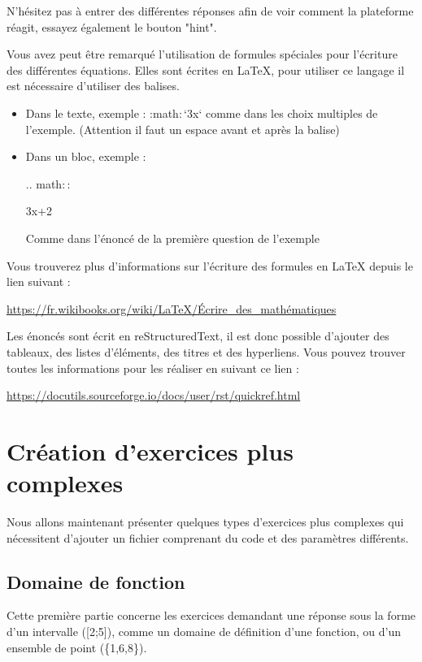 \documentclass{article}
\begin{document}
N'hésitez pas à entrer des différentes réponses afin de voir comment la plateforme réagit, essayez également le bouton "hint".

\bigskip
Vous avez peut être remarqué l'utilisation de formules spéciales pour l'écriture des différentes équations. Elles sont écrites en LaTeX, pour utiliser ce langage il est nécessaire d'utiliser des balises.
\bigskip

\begin{itemize}
    \item Dans le texte, exemple : :math${:}$`3x` comme dans les choix multiples de l'exemple. (Attention il faut un espace avant et après la balise)
    \item Dans un bloc, exemple :
    
    .. math${::}$
    
    \hspace{1cm} 3x+2
    
    Comme dans l'énoncé de la première question de l'exemple
\end{itemize}

Vous trouverez plus d'informations sur l'écriture des formules en LaTeX depuis le lien suivant :
\bigskip

\url{https://fr.wikibooks.org/wiki/LaTeX/Écrire_des_mathématiques}

\bigskip

Les énoncés sont écrit en reStructuredText, il est donc possible d'ajouter des tableaux, des listes d'éléments, des titres et des hyperliens. Vous pouvez trouver toutes les informations pour les réaliser en suivant ce lien :

\bigskip
\url{https://docutils.sourceforge.io/docs/user/rst/quickref.html}

\section{Création d'exercices plus complexes}

Nous allons maintenant présenter quelques types d'exercices plus complexes qui nécessitent d'ajouter un fichier comprenant du code et des paramètres différents.

\subsection{Domaine de fonction} \label{dom fct}

Cette première partie concerne les exercices demandant une réponse sous la forme d'un intervalle ([2;5]), comme un domaine de définition d'une fonction, ou d'un ensemble de point (\{1,6,8\}).
\bigskip
\end{document}
